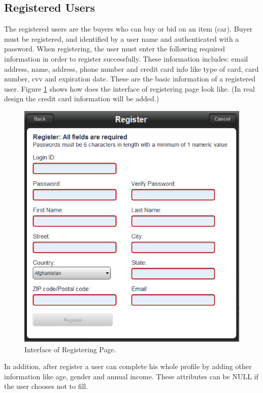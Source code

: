 \documentclass[12pt]{article}
\begin{document}
\subsection{Registered Users}
The registered users are the buyers who can buy or bid on an item (car). Buyer must be registered, and identified by a user name and authenticated with a password. When registering, the user must enter the following required information in order to register successfully. These information includes: email address, name, address, phone number and credit card info like type of card, card number, cvv and expiration date. These are the basic information of a registered user. Figure \ref{registered_users} shows how does the interface of registering page look like. (In real design the credit card information will be added.)
\begin{figure}[!h]
\caption{Interface of Registering Page.} \label{registered_users}
\begin{center}
\includegraphics[width=13cm]{registered_users}
\end{center}
\end{figure}
\par In addition, after register a user can complete his whole profile by adding other information like age, gender and annual income. These attributes can be NULL if the user chooses not to fill.
\end{document}
